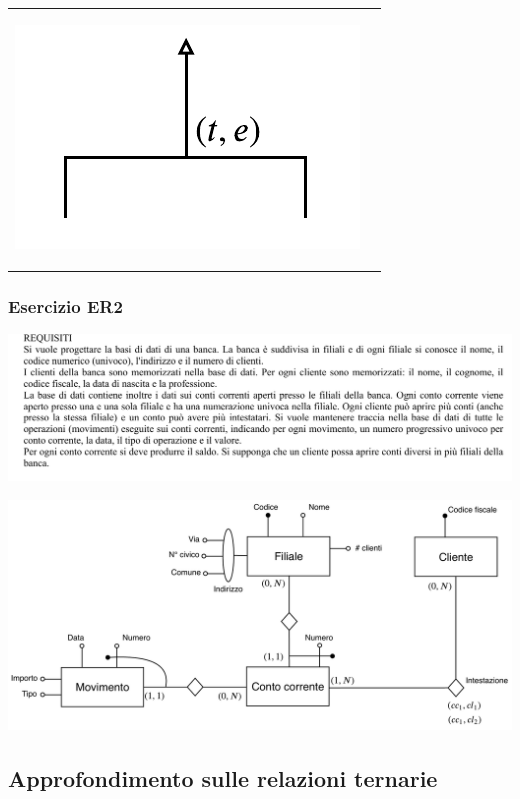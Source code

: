 \documentclass[a4paper, 10pt]{report}
\begin{document}
\begin{longtable}{| p{} | p{} |}
\begin{center}
\includegraphics[scale=0.6]{21ottobre06.pdf}
\end{center}
\end{longtable}

\subsubsection*{Esercizio ER2}

\begin{center}
\includegraphics[scale=1.0]{er2.pdf}

\includegraphics[scale=0.5]{21ottobre10.pdf}
\end{center}

\subsection*{Approfondimento sulle relazioni ternarie}
\end{document}

